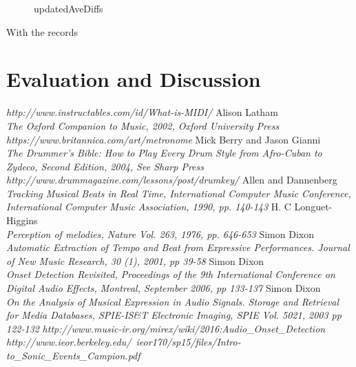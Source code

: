 \documentclass[a4paper, 11pt]{article}
\begin{document}
\begin{figure}
\caption{updatedAveDiffs}
\label{fig: upAveDiff}
\end{figure}

With the records 


\maketitle \section{Evaluation and Discussion}



\newpage
\begin{thebibliography}{99}
\textit{http://www.instructables.com/id/What-is-MIDI/}
Alison Latham\\
\textit{The Oxford Companion to Music, 2002, Oxford University Press}
\textit{https://www.britannica.com/art/metronome}
Mick Berry and Jason Gianni\\
\textit{The Drummer's Bible: How to Play Every Drum Style from Afro-Cuban to Zydeco, Second Edition, 2004, See Sharp Press}
\textit{http://www.drummagazine.com/lessons/post/drumkey/}
Allen and Dannenberg\\
\textit{Tracking Musical Beats in Real Time, International Computer Music Conference, International Computer Music Association, 1990, pp. 140-143}
H. C Longuet-Higgins\\
\textit{Perception of melodies, Nature Vol. 263, 1976, pp. 646-653}
Simon Dixon\\
\textit{Automatic Extraction of Tempo and Beat from Expressive Performances. Journal of New Music Research, 30 (1), 2001, pp 39-58}
Simon Dixon\\
\textit{Onset Detection Revisited, Proceedings of the 9th International Conference on Digital Audio Effects, Montreal, September 2006, pp 133-137}
Simon Dixon\\
\textit{On the Analysis of Musical Expression in Audio Signals. Storage and Retrieval for Media Databases, SPIE-IS\&T Electronic Imaging, SPIE Vol. 5021, 2003 pp 122-132}
\textit{http://www.music-ir.org/mirex/wiki/2016:Audio\_Onset\_Detection}
\textit{http://www.ieor.berkeley.edu/~ieor170/sp15/files/Intro-to\_Sonic\_Events\_Campion.pdf}

\end{thebibliography}
\end{document}
